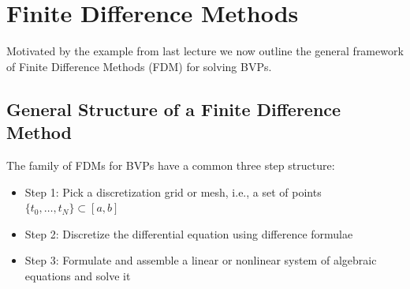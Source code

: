 \chapter{Finite Difference Methods}

Motivated by the example from last lecture we now outline 
the general framework of Finite Difference 
Methods (FDM) for solving BVPs. 

\section{General Structure of a Finite Difference Method}

The family of FDMs for BVPs have a common three step 
structure: 

\begin{itemize}
    \item Step 1: Pick a discretization grid or mesh, i.e., 
    a set of points $\{ t_0, \dots, t_N \} \subset [a, b]$
    \item Step 2: Discretize the differential equation using 
    difference formulae
    \item Step 3: Formulate and assemble a linear or nonlinear 
    system of algebraic equations and solve it  
\end{itemize}

